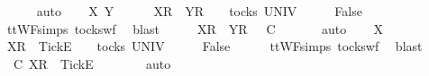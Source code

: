 \ \ \ \ \isamarkupfalse%
\ auto\isanewline
{}\isamarkupfalse%
\isanewline
\ \ \isamarkupfalse%
\ X\ Y\ {\isasymrho}\ {\isasymsigma}{\isacharprime}{\isacharprime}\isanewline
\ \ \isamarkupfalse%
\ {\isachardoublequoteopen}{\isacharbrackleft}X{\isacharbrackright}\isactrlsub R\ {\isacharhash}\ {\isacharbrackleft}Y{\isacharbrackright}\isactrlsub R\ {\isacharhash}\ {\isasymrho}\ {\isasymin}\ tocks\ UNIV{\isachardoublequoteclose}\isanewline
\ \ \isamarkupfalse%
\ \isamarkupfalse%
\ {\isachardoublequoteopen}False{\isachardoublequoteclose}\isanewline
\ \ \ \ \isamarkupfalse%
\ ttWF{\isachardot}simps{\isacharparenleft}{}{}{\isacharparenright}\ tocks{\isacharunderscore}wf\ \isamarkupfalse%
\ blast\isanewline
\ \ \isamarkupfalse%
\ \isamarkupfalse%
\ {\isachardoublequoteopen}{\isacharbrackleft}X{\isacharbrackright}\isactrlsub R\ {\isacharhash}\ {\isacharbrackleft}Y{\isacharbrackright}\isactrlsub R\ {\isacharhash}\ {\isasymrho}\ {\isasymlesssim}\isactrlsub C\ {\isasymsigma}{\isacharprime}{\isacharprime}{\isachardoublequoteclose}\isanewline
\ \ \ \ \isamarkupfalse%
\ auto\isanewline
{}\isamarkupfalse%
\isanewline
\ \ \isamarkupfalse%
\ X\ {\isasymrho}\ {\isasymsigma}{\isacharprime}{\isacharprime}\isanewline
\ \ \isamarkupfalse%
\ {\isachardoublequoteopen}{\isacharbrackleft}X{\isacharbrackright}\isactrlsub R\ {\isacharhash}\ {\isacharbrackleft}Tick{\isacharbrackright}\isactrlsub E\ {\isacharhash}\ {\isasymsigma}{\isacharprime}{\isacharprime}\ {\isasymin}\ tocks\ UNIV{\isachardoublequoteclose}\isanewline
\ \ \isamarkupfalse%
\ \isamarkupfalse%
\ {\isachardoublequoteopen}False{\isachardoublequoteclose}\isanewline
\ \ \ \ \isamarkupfalse%
\ ttWF{\isachardot}simps{\isacharparenleft}{}{}{\isacharparenright}\ tocks{\isacharunderscore}wf\ \isamarkupfalse%
\ blast\isanewline
\ \ \isamarkupfalse%
\ \isamarkupfalse%
\ {\isachardoublequoteopen}{\isasymrho}\ {\isasymlesssim}\isactrlsub C\ {\isacharbrackleft}X{\isacharbrackright}\isactrlsub R\ {\isacharhash}\ {\isacharbrackleft}Tick{\isacharbrackright}\isactrlsub E\ {\isacharhash}\ {\isasymsigma}{\isacharprime}{\isacharprime}{\isachardoublequoteclose}\isanewline
\ \ \ \ \isamarkupfalse%
\ auto\isanewline
{}\isamarkupfalse%
\isanewline
